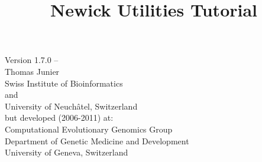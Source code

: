 
\setuppagenumbering[state=stop]

\setupframedtexts[
	frame=off,
	topframe=on,
	bottomframe=on,
	rulethickness=1mm]

\title{Newick Utilities Tutorial}

\startalignment[center]
Version 1.7.0 -- \currentdate \\
Thomas Junier  \\
Swiss Institute of Bioinformatics \\
and \\
University of Neuch\^{a}tel, Switzerland \\
but developed (2006-2011) at: \\
Computational Evolutionary Genomics Group \\
Department of Genetic Medicine and Development \\
University of Geneva, Switzerland \\
\stopalignment

